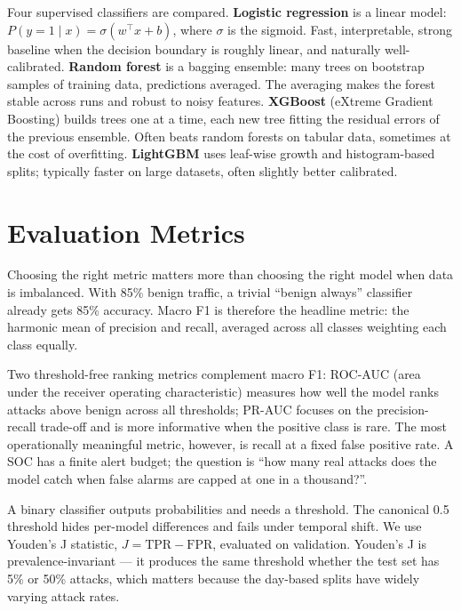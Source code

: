 Four supervised classifiers are compared. \textbf{Logistic regression} is
a linear model: $P(y = 1 \mid x) = \sigma(w^\top x + b)$, where $\sigma$
is the sigmoid. Fast, interpretable, strong baseline when the decision
boundary is roughly linear, and naturally well-calibrated.
\textbf{Random forest} is a bagging ensemble: many trees on bootstrap
samples of training data, predictions averaged. The averaging makes the
forest stable across runs and robust to noisy features.
\textbf{XGBoost} (eXtreme Gradient Boosting) builds trees one at a time,
each new tree fitting the residual errors of the previous ensemble. Often
beats random forests on tabular data, sometimes at the cost of
overfitting. \textbf{LightGBM} uses leaf-wise growth and histogram-based
splits; typically faster on large datasets, often slightly better
calibrated.


\section{Evaluation Metrics}

Choosing the right metric matters more than choosing the right model when
data is imbalanced. With 85\% benign traffic, a trivial ``benign always''
classifier already gets 85\% accuracy. Macro F1 is therefore the headline
metric: the harmonic mean of precision and recall, averaged across all
classes weighting each class equally.

Two threshold-free ranking metrics complement macro F1: ROC-AUC (area
under the receiver operating characteristic) measures how well the model
ranks attacks above benign across all thresholds; PR-AUC focuses on the
precision-recall trade-off and is more informative when the positive
class is rare. The most operationally meaningful metric, however, is
recall at a fixed false positive rate. A SOC has a finite alert budget;
the question is ``how many real attacks does the model catch when false
alarms are capped at one in a thousand?''.

A binary classifier outputs probabilities and needs a threshold. The
canonical 0.5 threshold hides per-model differences and fails under
temporal shift. We use Youden's J statistic, $J = \mathrm{TPR} -
\mathrm{FPR}$, evaluated on validation. Youden's J is prevalence-invariant
--- it produces the same threshold whether the test set has 5\% or 50\%
attacks, which matters because the day-based splits have widely varying
attack rates.

